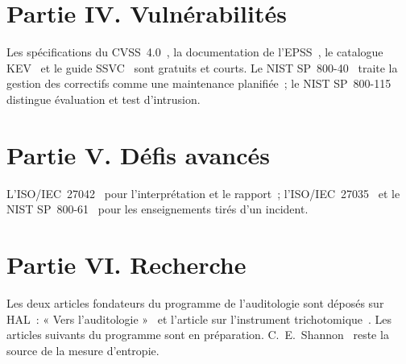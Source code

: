 \section*{Partie IV. Vulnérabilités}

Les spécifications du CVSS~4.0~\cite{first2023cvss4}, la documentation de
l'EPSS~\cite{firstepss}, le catalogue KEV~\cite{cisakev} et le guide
SSVC~\cite{cisa2022ssvc} sont gratuits et courts. Le NIST
SP~800-40~\cite{nist80040} traite la gestion des correctifs comme une
maintenance planifiée~; le NIST SP~800-115~\cite{nist800115} distingue
évaluation et test d'intrusion.

\section*{Partie V. Défis avancés}

L'ISO/IEC~27042~\cite{iso27042_2015} pour l'interprétation et le rapport~;
l'ISO/IEC~27035~\cite{iso27035} et le NIST SP~800-61~\cite{nist80061r2} pour
les enseignements tirés d'un incident.

\section*{Partie VI. Recherche}

Les deux articles fondateurs du programme de l'auditologie sont déposés sur
HAL~: « Vers l'auditologie »~\cite{minka2026auditologie} et l'article sur
l'instrument trichotomique~\cite{minka2026nek}. Les articles suivants du
programme sont en préparation. C.~E.~Shannon~\cite{shannon1948} reste la
source de la mesure d'entropie.
